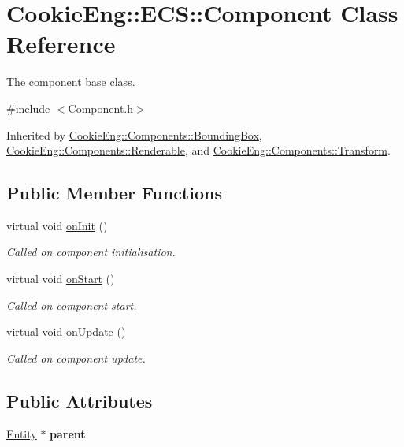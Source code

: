 \hypertarget{class_cookie_eng_1_1_e_c_s_1_1_component}{}\section{Cookie\+Eng\+:\+:E\+CS\+:\+:Component Class Reference}
\label{class_cookie_eng_1_1_e_c_s_1_1_component}


The component base class.  




{\ttfamily \#include $<$Component.\+h$>$}



Inherited by \hyperlink{class_cookie_eng_1_1_components_1_1_bounding_box}{Cookie\+Eng\+::\+Components\+::\+Bounding\+Box}, \hyperlink{class_cookie_eng_1_1_components_1_1_renderable}{Cookie\+Eng\+::\+Components\+::\+Renderable}, and \hyperlink{class_cookie_eng_1_1_components_1_1_transform}{Cookie\+Eng\+::\+Components\+::\+Transform}.

\subsection*{Public Member Functions}
\begin{DoxyCompactItemize}
\item 
virtual void \hyperlink{class_cookie_eng_1_1_e_c_s_1_1_component_a4b02b630558005a9c4723cf15b8b03d6}{on\+Init} ()
\begin{DoxyCompactList}\small\item\em Called on component initialisation. \end{DoxyCompactList}\item 
virtual void \hyperlink{class_cookie_eng_1_1_e_c_s_1_1_component_aaf8523586d57c3e40d4149f228755139}{on\+Start} ()
\begin{DoxyCompactList}\small\item\em Called on component start. \end{DoxyCompactList}\item 
virtual void \hyperlink{class_cookie_eng_1_1_e_c_s_1_1_component_a7c4a11f71e21181bc6f56841565b9a56}{on\+Update} ()
\begin{DoxyCompactList}\small\item\em Called on component update. \end{DoxyCompactList}\end{DoxyCompactItemize}
\subsection*{Public Attributes}
\begin{DoxyCompactItemize}
\item 
\mbox{\label{class_cookie_eng_1_1_e_c_s_1_1_component_a8a0c5a4ee3a87809d3e6d0bdaed3ebbe}} 
\hyperlink{class_cookie_eng_1_1_e_c_s_1_1_entity}{Entity} $\ast$ {\bfseries parent}
\end{DoxyCompactItemize}


